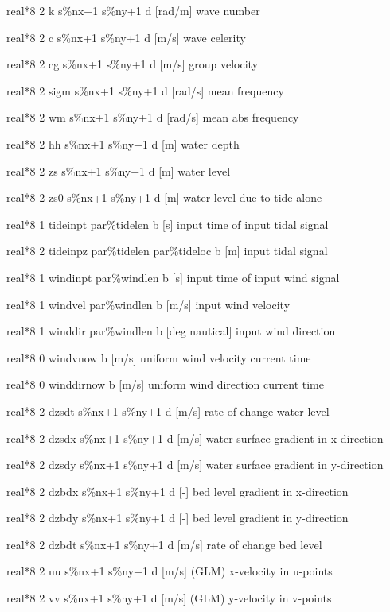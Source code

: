 real*8  2  k      s\%nx+1 s\%ny+1 d  [rad/m]    wave number

real*8  2  c      s\%nx+1 s\%ny+1 d  [m/s]      wave celerity

real*8  2  cg     s\%nx+1 s\%ny+1 d  [m/s]      group velocity

real*8  2  sigm   s\%nx+1 s\%ny+1 d  [rad/s]    mean frequency

real*8  2  wm     s\%nx+1 s\%ny+1 d  [rad/s]    mean abs frequency

real*8  2  hh     s\%nx+1 s\%ny+1 d  [m]        water depth

real*8  2  zs     s\%nx+1 s\%ny+1 d  [m]        water level

real*8  2  zs0    s\%nx+1 s\%ny+1 d  [m]        water level due to tide alone

real*8  1  tideinpt par\%tidelen b  [s]        input time of input tidal signal

real*8  2  tideinpz par\%tidelen par\%tideloc b  [m]        input tidal signal

real*8  1  windinpt par\%windlen b  [s]        input time of input wind signal

real*8  1  windvel  par\%windlen b  [m/s]        input wind velocity

real*8  1  winddir  par\%windlen b  [deg nautical]        input wind direction

real*8  0  windvnow b              [m/s]      uniform wind velocity current time

real*8  0  winddirnow b            [m/s]      uniform wind direction current time

real*8  2  dzsdt  s\%nx+1 s\%ny+1 d  [m/s]      rate of change water level

real*8  2  dzsdx  s\%nx+1 s\%ny+1 d  [m/s]      water surface gradient in x-direction

real*8  2  dzsdy  s\%nx+1 s\%ny+1 d  [m/s]      water surface gradient in y-direction

real*8  2  dzbdx  s\%nx+1 s\%ny+1 d  [-]        bed level gradient in x-direction

real*8  2  dzbdy  s\%nx+1 s\%ny+1 d  [-]        bed level gradient in y-direction

real*8  2  dzbdt  s\%nx+1 s\%ny+1 d  [m/s]      rate of change bed level 

real*8  2  uu     s\%nx+1 s\%ny+1 d  [m/s]      (GLM) x-velocity in u-points

real*8  2  vv     s\%nx+1 s\%ny+1 d  [m/s]      (GLM) y-velocity in v-points

